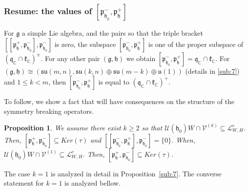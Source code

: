 \documentclass[12pt]{amsart}
\newtheorem{prop}[thm]{Proposition}
\theoremstyle{definition}
\theoremstyle{remark}
\newcommand{\g}{\mathfrak{g}}
\newcommand{\h}{\mathfrak{h}}
\renewcommand{\k}{{\mathfrak k}}
\newcommand{\p}{\mathfrak p}
\newcommand{\q}{\mathfrak q}
\newcommand{\C}{{\mathbb C}}
\numberwithin{equation}{section}
\begin{document}
\subsubsection{Resume: the values of $[\p_{\h_0}^-, \p_\h^+]$}  For $\g$ a simple Lie algebra, and  the pairs so that the triple bracket $[[\p_\h^+ , \p_{\h_0}^-], \p_{\h_0}^-]$ is zero,  the subspace $[\p_{\h_0}^-, \p_\h^+]$ is one of the proper  subspace of $(\q_\C \cap \k_\C)^\pm$.  For any other pair $(\g,\h)$  we obtain $[\p_{\h_0}^-, \p_\h^+]=\q_\C \cap \k_\C$.
  For $ (\g, \h) \cong  (\mathfrak{su}(m,n), \mathfrak{su}(k,n)\oplus \mathfrak{su}(m-k)\oplus \mathfrak u(1)) $  (details in \ref{sub:7}) and   $1\leq k < m $, then $[\p_{\h_0}^-, \p_\h^+]$ is equal to   $(\q_\C \cap \k_\C)^+$.


\smallskip

To follow, we show a fact that will have consequences on the structure of the symmetry breaking operators.
\begin{prop}\label{prop:orderkisnormal}We assume there exist $k\geq 2$ so that $\mathcal U(\h_0)W \cap \mathcal V^{(k)}
   \subseteq \mathcal L_{W,H}^c$. Then,   $[\p_\h^+, \p_{\h_0}^-] \subseteq Ker(\tau)$ and
$[[\p_{\h_0}^-, \p_\h^+],\p_{\h_0}^- ]=\{0\}$.  When, $\mathcal U(\h_0)W \cap \mathcal V^{(1)}
   \subseteq \mathcal L_{W,H}^c$. Then,   $[\p_\h^+, \p_{\h_0}^-] \subseteq Ker(\tau)$.
\end{prop}
  The case $k=1$ is analyzed in detail in  Proposition~\ref{sub:7}. The converse statement for $k=1$ is analyzed bellow.
\end{document}
